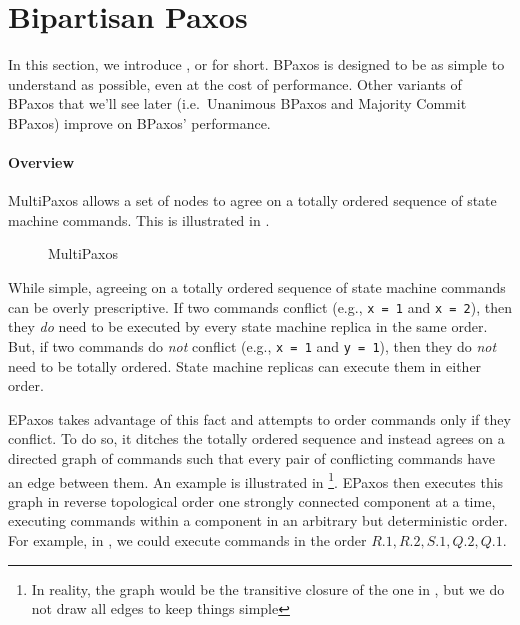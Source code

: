 \section{Bipartisan Paxos}
In this section, we introduce , or 
for short. BPaxos is designed to be as simple to understand as possible, even
at the cost of performance. Other variants of BPaxos that we'll see later
(i.e.\ Unanimous BPaxos and Majority Commit BPaxos) improve on BPaxos'
performance.

\paragraph{Overview}
MultiPaxos allows a set of nodes to agree on a totally ordered sequence of
state machine commands. This is illustrated in .

\begin{figure}[h]
  \centering
  \caption{MultiPaxos}
\end{figure}

While simple, agreeing on a totally ordered sequence of state machine commands
can be overly prescriptive. If two commands conflict (e.g., \texttt{x = 1} and
\texttt{x = 2}), then they \emph{do} need to be executed by every state machine
replica in the same order. But, if two commands do \emph{not} conflict (e.g.,
\texttt{x = 1} and \texttt{y = 1}), then they do \emph{not} need to be totally
ordered.  State machine replicas can execute them in either order.

EPaxos takes advantage of this fact and attempts to order commands only if they
conflict. To do so, it ditches the totally ordered sequence and instead agrees
on a directed graph of commands such that every pair of conflicting commands
have an edge between them. An example is illustrated in %
\footnote{%
  In reality, the graph would be the transitive closure of the one in
  , but we do not draw all edges to keep things simple
}.
EPaxos then executes this graph in reverse topological order one strongly
connected component at a time, executing commands within a component in an
arbitrary but deterministic order. For example, in , we
could execute commands in the order $R.1, R.2, S.1, Q.2, Q.1$.

